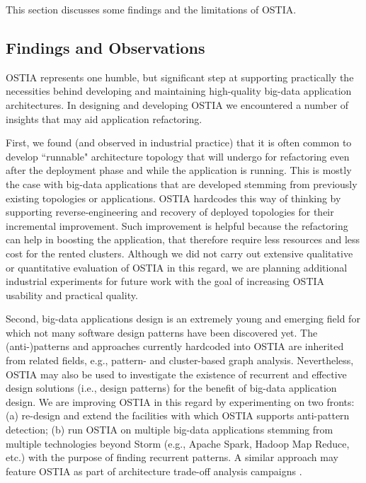 This section discusses some findings and the limitations of OSTIA.

\subsection{Findings and Observations}

OSTIA represents one humble, but significant step at supporting practically the necessities behind developing and maintaining high-quality big-data application architectures. In designing and developing OSTIA we encountered a number of insights that may aid application refactoring.

First, we found (and observed in industrial practice) that it is often common to develop ``runnable" architecture topology that will undergo for refactoring even after the deployment phase and  while the application is running.
This is mostly the case with big-data applications that are developed stemming from previously existing topologies or applications. OSTIA hardcodes this way of thinking by supporting reverse-engineering and recovery of deployed topologies for their incremental improvement. Such improvement is helpful because 
the refactoring can help in boosting the application, that therefore require less resources and less cost for the rented clusters. Although we did not carry out extensive qualitative or quantitative evaluation of OSTIA in this regard, we are planning additional industrial experiments for future work with the goal of increasing OSTIA usability and practical quality.

Second, big-data applications design is an extremely young and emerging field for which not many software design patterns have been discovered yet. The (anti-)patterns and approaches currently hardcoded into OSTIA are inherited from related fields, e.g., pattern- and cluster-based graph analysis. Nevertheless, OSTIA may also be used to investigate the existence of recurrent and effective design solutions (i.e., design patterns) for the benefit of big-data application design. We are improving OSTIA in this regard by experimenting on two fronts: (a) re-design and extend the facilities with which OSTIA supports anti-pattern detection; (b) run OSTIA on multiple big-data applications stemming from multiple technologies beyond Storm (e.g., Apache Spark, Hadoop Map Reduce, etc.) with the purpose of finding recurrent patterns. A similar approach may feature OSTIA as part of architecture trade-off analysis campaigns \cite{atam}.

